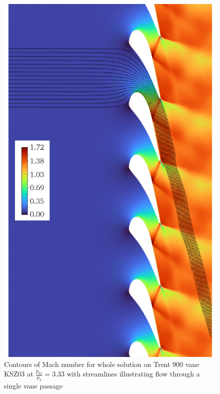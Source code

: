 \documentclass[a4paper, 11pt, oneside]{report}
\begin{document}
\begin{figure}[H]
      \centering
      \includegraphics[width=.85\textwidth]{figs/t900_mach_whole.png}
      \caption{Contours of Mach number for whole solution on Trent 900 vane KSZ03 at $\frac{p_{01}}{p_2}=3.33$ with streamlines illustrating flow through a single vane passage}
      \label{fig:t900_mach_whole}
\end{figure}
\end{document}
